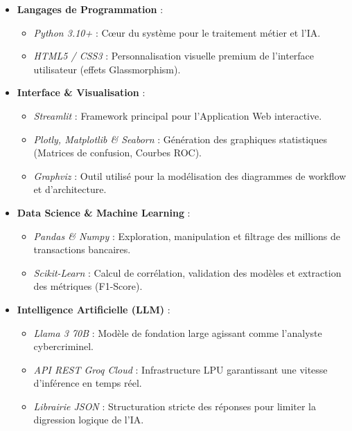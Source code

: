 \documentclass[12pt, a4paper, twoside]{report}
\begin{document}
\begin{itemize}\setlength\itemsep{0.5em}
    \item \textbf{Langages de Programmation} : 
    \begin{itemize}
        \item \textit{Python 3.10+} : Cœur du système pour le traitement métier et l'IA.
        \item \textit{HTML5 / CSS3} : Personnalisation visuelle premium de l'interface utilisateur (effets Glassmorphism).
    \end{itemize}
    
    \item \textbf{Interface \& Visualisation} : 
    \begin{itemize}
        \item \textit{Streamlit} : Framework principal pour l'Application Web interactive.
        \item \textit{Plotly, Matplotlib \& Seaborn} : Génération des graphiques statistiques (Matrices de confusion, Courbes ROC).
        \item \textit{Graphviz} : Outil utilisé pour la modélisation des diagrammes de workflow et d'architecture.
    \end{itemize}

    \item \textbf{Data Science \& Machine Learning} : 
    \begin{itemize}
        \item \textit{Pandas \& Numpy} : Exploration, manipulation et filtrage des millions de transactions bancaires.
        \item \textit{Scikit-Learn} : Calcul de corrélation, validation des modèles et extraction des métriques (F1-Score).
    \end{itemize}

    \item \textbf{Intelligence Artificielle (LLM)} : 
    \begin{itemize}
        \item \textit{Llama 3 70B} : Modèle de fondation large agissant comme l'analyste cybercriminel.
        \item \textit{API REST Groq Cloud} : Infrastructure LPU garantissant une vitesse d'inférence en temps réel.
        \item \textit{Librairie JSON} : Structuration stricte des réponses pour limiter la digression logique de l'IA.
    \end{itemize}
\end{itemize}
\end{document}
